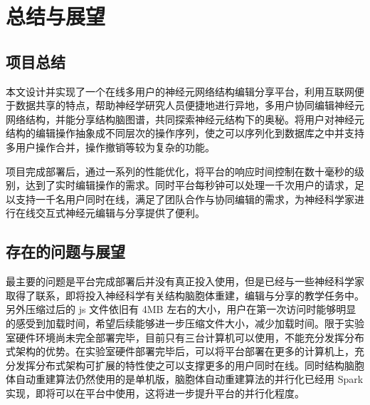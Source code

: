 \chapter{总结与展望}

\section{项目总结}
本文设计并实现了一个在线多用户的神经元网络结构编辑分享平台，利用互联网便于数据共享的特点，帮助神经学研究人员便捷地进行异地，多用户协同编辑神经元网络结构，并能分享结构脑图谱，共同探索神经元结构下的奥秘。将用户对神经元结构的编辑操作抽象成不同层次的操作序列，使之可以序列化到数据库之中并支持多用户操作合并，操作撤销等较为复杂的功能。

项目完成部署后，通过一系列的性能优化，将平台的响应时间控制在数十毫秒的级别，达到了实时编辑操作的需求。同时平台每秒钟可以处理一千次用户的请求，足以支持一千名用户同时在线，满足了团队合作与协同编辑的需求，为神经科学家进行在线交互式神经元编辑与分享提供了便利。

\section{存在的问题与展望}
最主要的问题是平台完成部署后并没有真正投入使用，但是已经与一些神经科学家取得了联系，即将投入神经科学有关结构脑胞体重建，编辑与分享的教学任务中。另外压缩过后的 js 文件依旧有 4MB 左右的大小，用户在第一次访问时能够明显的感受到加载时间，希望后续能够进一步压缩文件大小，减少加载时间。限于实验室硬件环境尚未完全部署完毕，目前只有三台计算机可以使用，不能充分发挥分布式架构的优势。在实验室硬件部署完毕后，可以将平台部署在更多的计算机上，充分发挥分布式架构可扩展的特性使之可以支撑更多的用户同时在线。同时结构脑胞体自动重建算法仍然使用的是单机版，脑胞体自动重建算法的并行化已经用 Spark 实现，即将可以在平台中使用，这将进一步提升平台的并行化程度。
